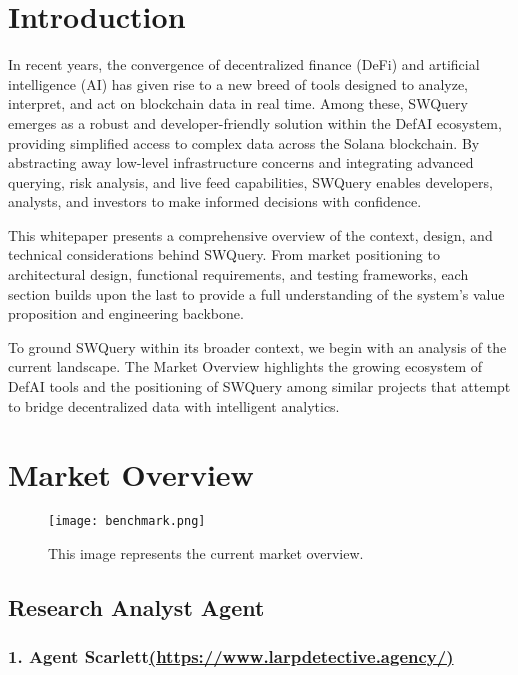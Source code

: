 \documentclass[
]{article}
\author{}
\date{}
\begin{document}
\tableofcontents
\newpage

\hypertarget{introduction}{%
\section{Introduction}\label{market-overview}}
In recent years, the convergence of decentralized finance (DeFi) and artificial intelligence (AI) has given rise to a new breed of tools designed to analyze, interpret, and act on blockchain data in real time. Among these, SWQuery emerges as a robust and developer-friendly solution within the DefAI ecosystem, providing simplified access to complex data across the Solana blockchain. By abstracting away low-level infrastructure concerns and integrating advanced querying, risk analysis, and live feed capabilities, SWQuery enables developers, analysts, and investors to make informed decisions with confidence.

This whitepaper presents a comprehensive overview of the context, design, and technical considerations behind SWQuery. From market positioning to architectural design, functional requirements, and testing frameworks, each section builds upon the last to provide a full understanding of the system’s value proposition and engineering backbone.

To ground SWQuery within its broader context, we begin with an analysis of the current landscape. The Market Overview highlights the growing ecosystem of DefAI tools and the positioning of SWQuery among similar projects that attempt to bridge decentralized data with intelligent analytics.

\hypertarget{market-overview}{%
\section{Market Overview}\label{market-overview}}

\begin{figure}[H]
\centering
\texttt{[image: benchmark.png]}
\caption{\label{fig:benchmark}This image represents the current market overview.}
\end{figure}

\hypertarget{research-analyst-agent}{%
\subsection{Research Analyst Agent}\label{research-analyst-agent}}

\hypertarget{agent-scarletthttpswww.larpdetective.agency}{%
\subsubsection{\texorpdfstring{1. Agent
Scarlett\href{https://www.larpdetective.agency/}{(https://www.larpdetective.agency/)}}{1. Agent Scarlett(https://www.larpdetective.agency/)}}\label{agent-scarletthttpswww.larpdetective.agency}}
\end{document}
